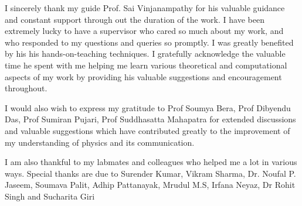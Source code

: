 \acknowledgments
\par I sincerely thank my guide Prof. Sai Vinjanampathy for his valuable guidance and constant support through out the duration of the work. I have been extremely lucky to have
a supervisor who cared so much about my work, and who responded to my questions and queries so
promptly. I was greatly benefited by his his hands-on-teaching techniques. I gratefully acknowledge the valuable time he spent with me helping me learn various theoretical and computational aspects of my work by providing his valuable suggestions and encouragement throughout.
\par 
I would also wish to express my gratitude to Prof Soumya Bera, Prof Dibyendu Das, Prof Sumiran Pujari, Prof Suddhasatta Mahapatra for extended discussions and valuable suggestions which have contributed greatly to the improvement of my understanding of physics  and its communication.
\par 
I am also thankful to my labmates and colleagues who helped me a lot in various ways. Special thanks are due to Surender Kumar, Vikram Sharma, Dr. Noufal P. Jaseem, Soumava Palit, Adhip Pattanayak, Mrudul M.S, Irfana Neyaz,   Dr Rohit Singh and Sucharita Giri






\signature{\today}
\begin{comment}
Post. Doc. Fellow who developed the idea of HHG due to de-
fects in solid. Ms. Irfana Neyaz and Ms. Sucharita Giri, whose academic
discussions and advice were so interesting and useful.
I would like to thank my dear friend and colleague, Jiban Kangsabanik, PhD
student  in our group, for all the
time and efforts they have put in to obtain successful results.
This section is for the acknowledgments. Please keep this brief and resist the temptation of writing flowery prose! Do include all those who helped you, e.g. other faculty/staff you consulted, colleagues who assisted etc.
\end{comment}

